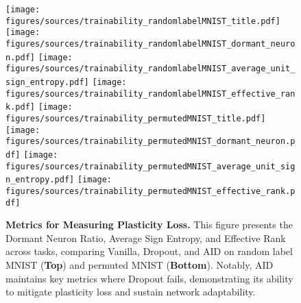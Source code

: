 

\begin{figure*}[h]
    \centering
    \texttt{[image: figures/sources/trainability\_randomlabelMNIST\_title.pdf]}\\
    \texttt{[image: figures/sources/trainability\_randomlabelMNIST\_dormant\_neuron.pdf]}
    \texttt{[image: figures/sources/trainability\_randomlabelMNIST\_average\_unit\_sign\_entropy.pdf]}
    \texttt{[image: figures/sources/trainability\_randomlabelMNIST\_effective\_rank.pdf]}
    \texttt{[image: figures/sources/trainability\_permutedMNIST\_title.pdf]}\\
    \texttt{[image: figures/sources/trainability\_permutedMNIST\_dormant\_neuron.pdf]}
    \texttt{[image: figures/sources/trainability\_permutedMNIST\_average\_unit\_sign\_entropy.pdf]}
    \texttt{[image: figures/sources/trainability\_permutedMNIST\_effective\_rank.pdf]}

\caption{\textbf{Metrics for Measuring Plasticity Loss.} This figure presents the Dormant Neuron Ratio, Average Sign Entropy, and Effective Rank across tasks, comparing Vanilla, Dropout, and AID on random label MNIST (\textbf{Top}) and permuted MNIST (\textbf{Bottom}). Notably, AID maintains key metrics where Dropout fails, demonstrating its ability to mitigate plasticity loss and sustain network adaptability.}
    
    \label{exp_trainability_metrics}
\end{figure*}


